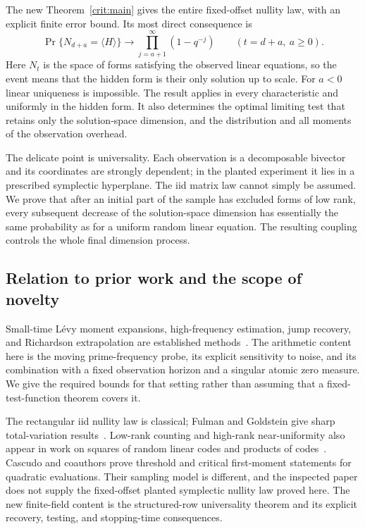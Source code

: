 The new Theorem~\ref{crit:main} gives the entire fixed-offset nullity law, with an explicit finite error bound. Its most direct consequence is
\[
\Pr\{N_{d+a}=\langle H\rangle\}
\longrightarrow \prod_{j=a+1}^{\infty}(1-q^{-j})
\qquad(t=d+a,\ a\ge0).
\]
Here $N_t$ is the space of forms satisfying the observed linear equations, so the event means that the hidden form is their only solution up to scale. For $a<0$ linear uniqueness is impossible. The result applies in every characteristic and uniformly in the hidden form. It also determines the optimal limiting test that retains only the solution-space dimension, and the distribution and all moments of the observation overhead.

The delicate point is universality. Each observation is a decomposable bivector and its coordinates are strongly dependent; in the planted experiment it lies in a prescribed symplectic hyperplane. The iid matrix law cannot simply be assumed. We prove that after an initial part of the sample has excluded forms of low rank, every subsequent decrease of the solution-space dimension has essentially the same probability as for a uniform random linear equation. The resulting coupling controls the whole final dimension process.

\subsection{Relation to prior work and the scope of novelty}

Small-time L\'evy moment expansions, high-frequency estimation, jump recovery, and Richardson extrapolation are established methods~\cite{Figueroa2008,Nickl2016,Gonzalez2021}. The arithmetic content here is the moving prime-frequency probe, its explicit sensitivity to noise, and its combination with a fixed observation horizon and a singular atomic zero measure. We give the required bounds for that setting rather than assuming that a fixed-test-function theorem covers it.

The rectangular iid nullity law is classical; Fulman and Goldstein give sharp total-variation results~\cite{FulmanGoldstein2015}. Low-rank counting and high-rank near-uniformity also appear in work on squares of random linear codes and products of codes~\cite{Cascudo2015,Randriambololona2015}. Cascudo and coauthors prove threshold and critical first-moment statements for quadratic evaluations. Their sampling model is different, and the inspected paper does not supply the fixed-offset planted symplectic nullity law proved here. The new finite-field content is the structured-row universality theorem and its explicit recovery, testing, and stopping-time consequences.

